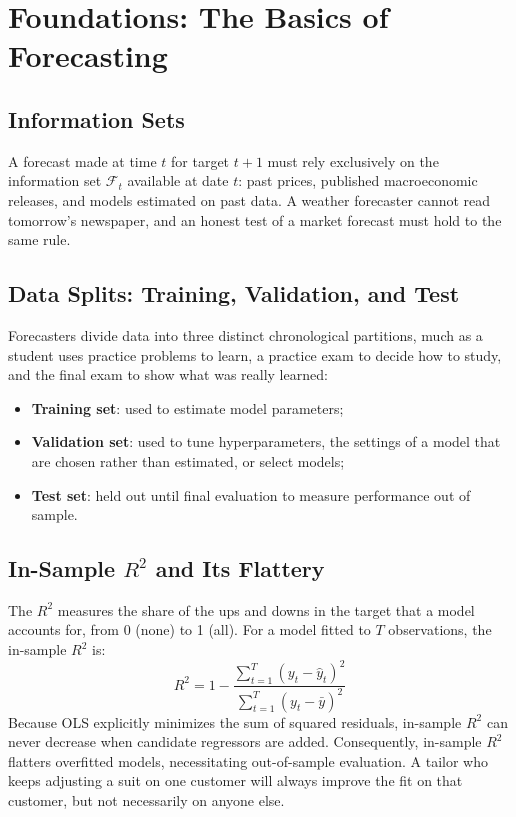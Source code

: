 \section{Foundations: The Basics of Forecasting}
\label{sec:09-foundations}

\subsection{Information Sets}
A forecast made at time $t$ for target $t+1$ must rely exclusively on the information set $\mathcal{F}_t$ available at date $t$: past prices, published macroeconomic releases, and models estimated on past data. A weather forecaster cannot read tomorrow's newspaper, and an honest test of a market forecast must hold to the same rule.

\subsection{Data Splits: Training, Validation, and Test}
Forecasters divide data into three distinct chronological partitions, much as a student uses practice problems to learn, a practice exam to decide how to study, and the final exam to show what was really learned:
\begin{itemize}
  \item \textbf{Training set}: used to estimate model parameters;
  \item \textbf{Validation set}: used to tune hyperparameters, the settings of a model that are chosen rather than estimated, or select models;
  \item \textbf{Test set}: held out until final evaluation to measure performance out of sample.
\end{itemize}

\subsection{In-Sample $R^2$ and Its Flattery}
The $R^2$ measures the share of the ups and downs in the target that a model accounts for, from 0 (none) to 1 (all). For a model fitted to $T$ observations, the in-sample $R^2$ is:
\begin{equation}
  R^2 = 1 - \frac{\sum_{t=1}^T (y_t - \hat{y}_t)^2}{\sum_{t=1}^T (y_t - \bar{y})^2}
  \label{eq:09-r2}
\end{equation}
Because OLS explicitly minimizes the sum of squared residuals, in-sample $R^2$ can never decrease when candidate regressors are added. Consequently, in-sample $R^2$ flatters overfitted models, necessitating out-of-sample evaluation. A tailor who keeps adjusting a suit on one customer will always improve the fit on that customer, but not necessarily on anyone else.

